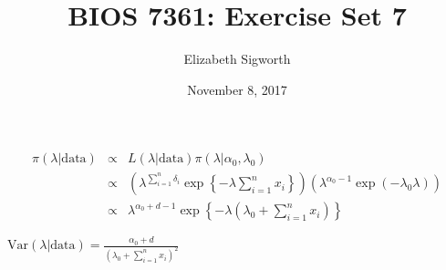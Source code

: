 \documentclass[]{article}
\title{BIOS 7361: Exercise Set 7}
\author{Elizabeth Sigworth}
\date{November 8, 2017}
\begin{document}
\maketitle

\begin{eqnarray*}
\pi(\lambda|\text{data}) &\propto& L(\lambda|\text{data}) \pi(\lambda|\alpha_0,\lambda_0) \\
&\propto& \left(\lambda^{\sum_{i=1}^n \delta_i} \exp\left\{-\lambda \sum_{i=1}^n x_i \right\} \right) \left(\lambda^{\alpha_0-1}\exp(-\lambda_0\lambda) \right) \\
&\propto& \lambda^{\alpha_0+d - 1}\exp\left\{-\lambda(\lambda_0 + \sum_{i=1}^n x_i ) \right\}
\end{eqnarray*}

$\text{Var}(\lambda|\text{data}) = \frac{\alpha_0 + d}{(\lambda_0 + \sum_{i=1}^n x_i)^2}$
\end{document}
